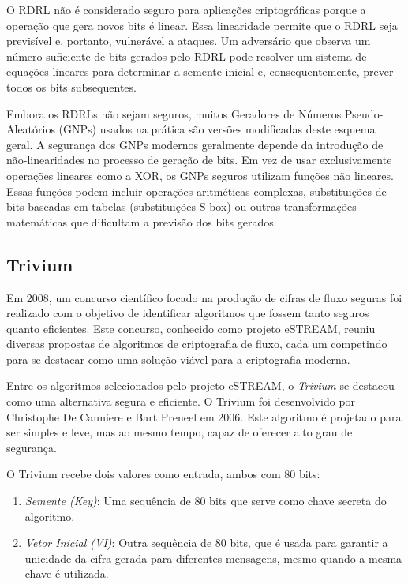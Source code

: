 

O RDRL não é considerado seguro para aplicações criptográficas porque a operação que gera novos bits é linear.
Essa linearidade permite que o RDRL seja previsível e, portanto, vulnerável a ataques.
Um adversário que observa um número suficiente de bits gerados pelo RDRL pode resolver um sistema de equações lineares para determinar a semente inicial e, consequentemente, prever todos os bits subsequentes.

Embora os RDRLs não sejam seguros, muitos Geradores de Números Pseudo-Aleatórios (GNPs) usados na prática são versões modificadas deste esquema geral.
A segurança dos GNPs modernos geralmente depende da introdução de não-linearidades no processo de geração de bits.
Em vez de usar exclusivamente operações lineares como a XOR, os GNPs seguros utilizam funções não lineares.
Essas funções podem incluir operações aritméticas complexas, substituições de bits baseadas em tabelas (substituições S-box) ou outras transformações matemáticas que dificultam a previsão dos bits gerados.

\subsection{Trivium}
\label{sec:trivium}

Em 2008, um concurso científico focado na produção de cifras de fluxo seguras foi realizado com o objetivo de identificar algoritmos que fossem tanto seguros quanto eficientes.
Este concurso, conhecido como projeto eSTREAM, reuniu diversas propostas de algoritmos de criptografia de fluxo, cada um competindo para se destacar como uma solução viável para a criptografia moderna.

Entre os algoritmos selecionados pelo projeto eSTREAM, o {\em Trivium} \cite{DeCanniere06} se destacou como uma alternativa segura e eficiente.
O Trivium foi desenvolvido por Christophe De Canniere e Bart Preneel em 2006.
Este algoritmo é projetado para ser simples e leve, mas ao mesmo tempo, capaz de oferecer alto grau de segurança.

O Trivium recebe dois valores como entrada, ambos com 80 bits:
\begin{enumerate}
\item {\em Semente (Key)}: Uma sequência de 80 bits que serve como chave secreta do algoritmo.
\item {\em Vetor Inicial (VI)}: Outra sequência de 80 bits, que é usada para garantir a unicidade da cifra gerada para diferentes mensagens, mesmo quando a mesma chave é utilizada.
\end{enumerate}


